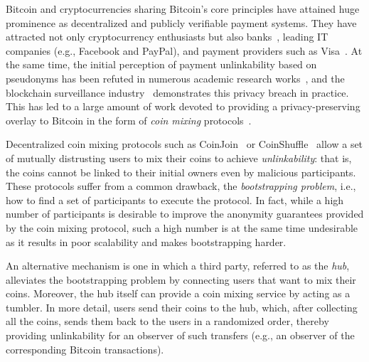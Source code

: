 Bitcoin and cryptocurrencies sharing Bitcoin's core principles have attained huge prominence as decentralized and publicly verifiable payment systems. 
They have attracted not only cryptocurrency enthusiasts but also banks~\cite{bankDigitalEuro2021}, leading  IT companies (e.g., Facebook and PayPal), and payment providers such as Visa~\cite{ARXIV:CEGKKM21}. 
At the same time, the initial perception of payment unlinkability based on pseudonyms has been refuted in numerous academic research works~\cite{IMC:MPJLMV16,ARXIV:SHMM21}, and the blockchain surveillance industry~\cite{ARXIV:HSRK21} demonstrates this privacy breach in practice. 
This has led to a large amount of work devoted to providing a privacy-preserving overlay to Bitcoin in the form of \emph{coin mixing} protocols~\cite{FC:BBSU12,ARES:GheFdhWei22}. 

Decentralized coin mixing protocols such as CoinJoin~\cite{coinjoin} or CoinShuffle~\cite{ESORICS:RufMorKat14,EPRINT:RufMorKat16,FCW:RufMor17} allow a set of mutually distrusting users to mix their coins to achieve \emph{unlinkability}: that is, the coins cannot be linked to their initial owners even by malicious participants. 
These protocols suffer from a common drawback, the \emph{bootstrapping problem}, i.e., how to find a set of participants to execute the protocol. In fact, while a high number of participants is desirable to improve the anonymity guarantees provided by the coin mixing protocol, such a high number is at the same time undesirable as it results in poor scalability and  makes bootstrapping harder.

An alternative mechanism is one in which a third party, referred to as the \emph{hub}, alleviates the bootstrapping problem by connecting users that want to mix their coins. 
Moreover, the hub itself can provide a coin mixing service by acting as a tumbler. In more detail, users send their coins to the hub, which, after collecting all the coins, sends them back to the users in a randomized order, thereby providing unlinkability for an observer of such transfers (e.g., an observer of the corresponding Bitcoin transactions).

